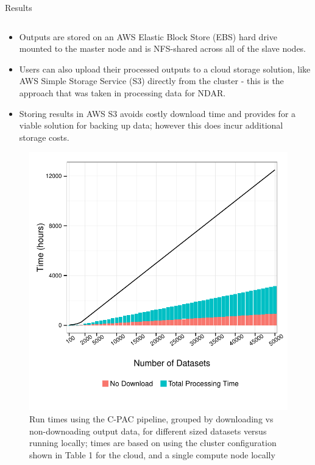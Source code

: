 \documentclass[final,hyperref={pdfpagelabels=false}]{beamer}
\begin{document}
\begin{frame}
\begin{columns}
\begin{column}{.5\textwidth}
{\begin{block}{Results}
\begin{column}{.47\textwidth}
\begin{itemize}
                  \item Outputs are stored on an AWS Elastic Block Store (EBS) hard drive mounted to the master node and is NFS-shared across all of the slave nodes.
                  \item Users can also upload their processed outputs to a cloud storage solution, like AWS Simple Storage Service (S3) directly from the cluster - this is the approach that was taken in processing data for NDAR.
                  \item Storing results in AWS S3 avoids costly download time and provides for a viable solution for backing up data; however this does incur additional storage costs.
              \end{itemize}
              \begin{figure}
                  \includegraphics[width=.99\textwidth]{cpac-times.pdf}
                  \caption{\label{fig:cpac-times}Run times using the C-PAC pipeline, grouped by downloading vs non-downoading output data, for different sized datasets versus running locally; times are based on using the cluster configuration shown in Table 1 for the cloud, and a single compute node locally}
              \end{figure}
              \begin{figure}

\end{figure}
\end{column}
\end{block}}
\end{column}
\end{columns}
\end{frame}
\end{document}
